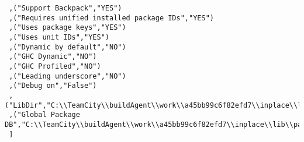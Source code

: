 \begin{verbatim}
 ,("Support Backpack","YES")
 ,("Requires unified installed package IDs","YES")
 ,("Uses package keys","YES")
 ,("Uses unit IDs","YES")
 ,("Dynamic by default","NO")
 ,("GHC Dynamic","NO")
 ,("GHC Profiled","NO")
 ,("Leading underscore","NO")
 ,("Debug on","False")
 ,("LibDir","C:\\TeamCity\\buildAgent\\work\\a45bb99c6f82efd7\\inplace\\lib")
 ,("Global Package DB","C:\\TeamCity\\buildAgent\\work\\a45bb99c6f82efd7\\inplace\\lib\\package.conf.d")
 ]
\end{verbatim}

